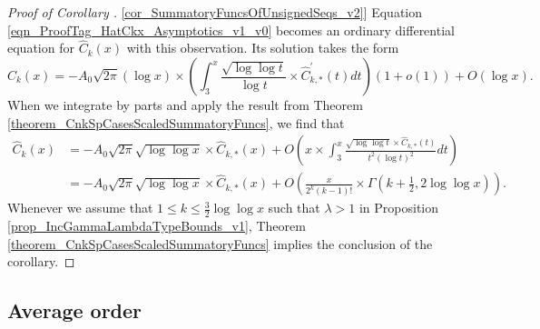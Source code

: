\documentclass[11pt,reqno,a4letter]{article}
\newcommand{\hlocalref}[1]{\hyperref[#1]{\ref{#1}}}
\numberwithin{equation}{section}
\numberwithin{figure}{section}
\numberwithin{table}{section}
\theoremstyle{plain}
\numberwithin{theorem}{section}
\theoremstyle{definition}
\begin{document}
\begin{proof}[Proof of Corollary \hlocalref{cor_SummatoryFuncsOfUnsignedSeqs_v2}]
Equation \eqref{eqn_ProofTag_HatCkx_Asymptotics_v1_v0} 
becomes an ordinary differential equation for $\widehat{C}_k(x)$ with this 
observation. Its solution takes the form 
\[
\widehat{C}_k(x) = -A_0\sqrt{2\pi}(\log x) \times \left(\int_3^x 
     \frac{\sqrt{\log\log t}}{\log t} \times \widehat{C}_{k,\ast}^{\prime}(t) dt\right)(1+o(1)) + 
     O(\log x). 
\]
When we integrate by parts and apply the result from 
Theorem \hlocalref{theorem_CnkSpCasesScaledSummatoryFuncs}, we find that 
\begin{align*}
\widehat{C}_k(x) & = -A_0 \sqrt{2\pi} \sqrt{\log\log x} \times \widehat{C}_{k,\ast}(x) + 
     O\left(x \times \int_3^x \frac{\sqrt{\log\log t} \times \widehat{C}_{k,\ast}(t)}{t^2 (\log t)^2} dt\right) \\ 
     & = -A_0 \sqrt{2\pi} \sqrt{\log\log x} \times \widehat{C}_{k,\ast}(x) + 
     O\left(\frac{x}{2^k (k-1)!} \times \Gamma\left(k+\frac{1}{2}, 2\log\log x\right)\right). 
\end{align*} 
Whenever we assume that $1 \leq k \leq \frac{3}{2} \log\log x$ such that $\lambda > 1$ in 
Proposition \hlocalref{prop_IncGammaLambdaTypeBounds_v1}, 
Theorem \hlocalref{theorem_CnkSpCasesScaledSummatoryFuncs} 
implies the conclusion of the corollary. 
\end{proof}

\subsection{Average order}
\label{subSection_AvgOrdersOfTheUnsignedSequences} 
\end{document}
